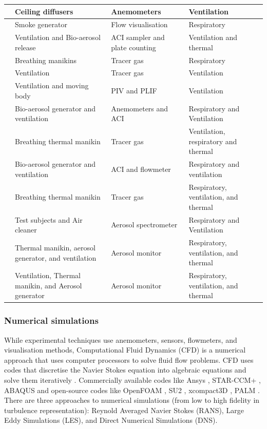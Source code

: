 \documentclass[a4paper,12pt]{elsarticle}
\begin{document}
\begin{center}
\begin{longtable}{|m{3.55cm}|m{3.5cm}|m{3.5cm}|m{3.5cm}|}
    \hline
    \citet{arpino2023cfd}& Ceiling diffusers & Anemometers & Ventilation \\
    \hline
    \citet{giri2022colliding}& Smoke generator & Flow visualisation & Respiratory\\
    \hline
    \citet{liu2020experimental}& Ventilation and Bio-aerosol release & ACI sampler and plate counting & Ventilation and thermal \\
    \hline
    \citet{qian2008dispersion}& Breathing manikins & Tracer gas & Respiratory\\
    \hline
    \citet{lu2020reducing}& Ventilation & Tracer gas & Ventilation\\
    \hline
    \citet{poussou2010flow}& Ventilation and moving body & PIV and PLIF & Ventilation \\
    \hline
    \citet{liu2020full}& Bio-aerosol generator and ventilation & Anemometers and ACI & Respiratory and Ventilation \\
    \hline
    \citet{cheng2021experimental}& Breathing thermal manikin & Tracer gas & Ventilation, respiratory and thermal\\
    \hline
    \citet{liu2023estimating}& Bio-aerosol generator and ventilation & ACI and flowmeter & Respiratory and ventilation \\
    \hline
    \citet{li2021effects}& Breathing thermal manikin & Tracer gas & Respiratory, ventilation, and thermal\\
    \hline
    \citet{duill2021impact}& Test subjects and Air cleaner &  Aerosol spectrometer & Respiratory and Ventilation\\
    \hline
    \citet{zhou2021experimental}& Thermal manikin, aerosol generator, and ventilation  & Aerosol monitor & Respiratory, ventilation, and thermal \\
    \hline
    \citet{zhang2019distribution}& Ventilation, Thermal manikin, and Aerosol generator & Aerosol monitor & Respiratory, ventilation, and thermal\\
    \hline
\end{longtable}
\end{center}

\subsubsection{Numerical simulations}

While experimental techniques use anemometers, sensors, flowmeters, and visualisation methods, Computational Fluid Dynamics (CFD) is a numerical approach that uses computer processors to solve fluid flow problems. CFD uses codes that discretise the Navier Stokes equation into algebraic equations and solve them iteratively \cite{ferziger2002computational}. Commercially available codes like Ansys \cite{ANSYS}, STAR-CCM+ \cite{starccm}, ABAQUS \cite{abaqus} and open-source codes like OpenFOAM \cite{openfoam}, SU2 \cite{su2}, xcompact3D \cite{xcompact3d}, PALM \cite{palm}. There are three approaches to numerical simulations (from low to high fidelity in turbulence representation): Reynold Averaged Navier Stokes (RANS), Large Eddy Simulations (LES), and Direct Numerical Simulations (DNS).
\end{document}

